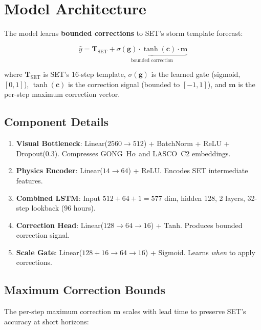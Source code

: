 \documentclass[11pt,a4paper]{article}
\begin{document}
\section{Model Architecture}

The model learns \textbf{bounded corrections} to SET's storm template forecast:

\begin{equation}
\hat{y} = \mathbf{T}_{\text{SET}} + \underbrace{\sigma(\mathbf{g}) \cdot \tanh(\mathbf{c}) \cdot \mathbf{m}}_{\text{bounded correction}}
\label{eq:output}
\end{equation}

where $\mathbf{T}_{\text{SET}}$ is SET's 16-step template, $\sigma(\mathbf{g})$ is the learned gate (sigmoid, $[0,1]$), $\tanh(\mathbf{c})$ is the correction signal (bounded to $[-1,1]$), and $\mathbf{m}$ is the per-step maximum correction vector.

\subsection{Component Details}

\begin{enumerate}[nosep]
    \item \textbf{Visual Bottleneck}: Linear($2560 \to 512$) + BatchNorm + ReLU + Dropout(0.3). Compresses GONG~H$\alpha$ and LASCO~C2 embeddings.
    \item \textbf{Physics Encoder}: Linear($14 \to 64$) + ReLU. Encodes SET intermediate features.
    \item \textbf{Combined LSTM}: Input $512 + 64 + 1 = 577$ dim, hidden 128, 2 layers, 32-step lookback (96 hours).
    \item \textbf{Correction Head}: Linear($128 \to 64 \to 16$) + Tanh. Produces bounded correction signal.
    \item \textbf{Scale Gate}: Linear($128+16 \to 64 \to 16$) + Sigmoid. Learns \textit{when} to apply corrections.
\end{enumerate}

\subsection{Maximum Correction Bounds}

The per-step maximum correction $\mathbf{m}$ scales with lead time to preserve SET's accuracy at short horizons:
\end{document}
